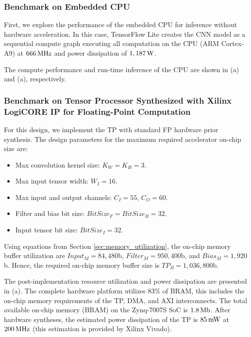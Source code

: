 \subsubsection{Benchmark on Embedded CPU}
First, we explore the performance of the embedded CPU for inference without hardware acceleration. In this case, TensorFlow Lite creates the CNN model as a sequential compute graph executing all computation on the CPU (ARM Cortex-A9) at $\unit[666]{MHz}$ and power dissipation of $\unit[1,187]{W}$.

The compute performance and run-time inference of the CPU are shown in (a) and (a), respectively.

\subsubsection{Benchmark on Tensor Processor Synthesized with Xilinx LogiCORE IP for Floating-Point Computation}
For this design, we implement the TP with standard FP hardware prior synthesis. The design parameters for the maximum required accelerator on-chip size are:
\begin{itemize}
	\item Max convolution kernel size: $K_W = K_H = 3$.
	\item Max input tensor width: $W_I = 16$.
	\item Max input and output channels: $C_I = 55$, $C_O = 60$.
	\item Filter and bias bit size: $BitSize_F=BitSize_B=32$.
	\item Input tensor bit size: $BitSize_I=32$.
\end{itemize}

Using equations from Section \ref{sec:memory_utilization}, the on-chip memory buffer utilization are $Input_M=84,480$b, $Filter_M=950,400$b, and $Bias_M=1,920$b. Hence, the required on-chip memory buffer size is $TP_B=1,036,800$b.

The post-implementation resource utilization and power dissipation are presented in (a). The complete hardware platform utilizes 83\% of BRAM, this includes the on-chip memory requirements of the TP, DMA, and AXI interconnects. The total available on-chip memory (BRAM) on the Zynq-7007S SoC is $\unit[1.8]{Mb}$. After hardware syntheses, the estimated power dissipation of the TP is $\unit[85]{mW}$ at $\unit[200]{MHz}$ (this estimation is provided by Xilinx Vivado).


